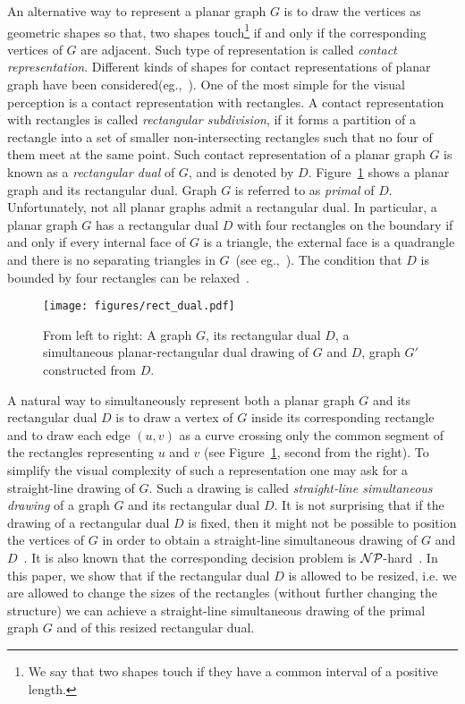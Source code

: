 \documentclass{llncs}
\begin{document}
An alternative way to represent a planar graph $G$  is to draw the vertices as geometric shapes so that, two shapes touch\footnote{We say that two shapes touch if they have a common interval of a positive length.} if and only if the corresponding vertices of $G$ are adjacent. Such type of representation is called \emph{contact representation}. Different kinds of shapes for contact representations of planar graph have been considered(eg.,~\cite{AlamBFKK12,FraysseixMR94,DuncanGHKK12,GoncalvesLP12}). One of the most  simple  for the visual perception is a contact representation with rectangles. 
A contact representation with rectangles is called  \emph{rectangular subdivision}, if it forms a partition of a rectangle into a set of smaller non-intersecting rectangles such that no four of them meet at the same point. Such contact representation of a planar graph $G$ is known as a \emph{rectangular dual} of $G$, and is denoted by $D$. Figure~\ref{fig:rect_dual} shows a planar graph and its rectangular dual.  Graph $G$  is referred to as \emph{primal} of $D$. Unfortunately, not all planar graphs admit a rectangular dual. In particular, a planar graph $G$ has a rectangular dual $D$ with four rectangles on the boundary if and only if every internal face of $G$ is a triangle, the external face is a quadrangle and there is  no separating triangles in $G$~(see eg.,~\cite[Theorem~2.1]{He99}). The condition that $D$ is bounded by four rectangles can be relaxed~\cite{He93}.

\begin{figure}[htb]
\centering
\texttt{[image: figures/rect\_dual.pdf]}
\caption{From left to right: A graph $G$, its rectangular dual $D$, a simultaneous planar-rectangular dual drawing of $G$ and $D$, graph $G'$ constructed from $D$. }
\label{fig:rect_dual}
\end{figure}

A natural way to simultaneously represent both a planar graph $G$ and its rectangular dual $D$ is to draw a vertex of $G$ inside its corresponding rectangle  and to draw each edge $(u,v)$ as a curve crossing only the common segment of the rectangles representing $u$ and $v$ (see Figure~\ref{fig:rect_dual}, second from the right). To simplify the visual complexity of such a representation one may ask for a straight-line drawing of $G$.  Such a drawing is called \emph{straight-line simultaneous  drawing} of a graph $G$ and  its rectangular dual $D$.    It is not surprising that if the drawing of a rectangular dual $D$ is fixed, then it might not be possible to position the vertices of $G$  in order to obtain a straight-line simultaneous drawing of $G$ and $D$~\cite[Lemma~1]{AlamKKM14}. It is also known that the corresponding  decision problem is $\cal NP$-hard~\cite[Theorem~1]{AlamKKM14}. In this paper, we show that if the rectangular dual $D$ is allowed to be resized, i.e. we are allowed to change the sizes of the rectangles (without further changing the structure) we can achieve a straight-line simultaneous drawing of the primal graph $G$ and of this resized rectangular dual. 
\end{document}
